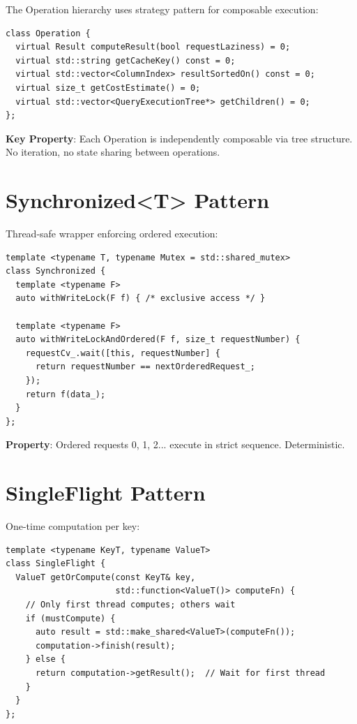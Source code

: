 \documentclass[12pt,oneside,a4paper]{book}
\theoremstyle{definition}
\begin{document}
The Operation hierarchy uses strategy pattern for composable execution:

\begin{lstlisting}
class Operation {
  virtual Result computeResult(bool requestLaziness) = 0;
  virtual std::string getCacheKey() const = 0;
  virtual std::vector<ColumnIndex> resultSortedOn() const = 0;
  virtual size_t getCostEstimate() = 0;
  virtual std::vector<QueryExecutionTree*> getChildren() = 0;
};
\end{lstlisting}

\textbf{Key Property}: Each Operation is independently composable via tree structure.
No iteration, no state sharing between operations.

\section{Synchronized<T> Pattern}
\label{sec:synchronized-pattern}

Thread-safe wrapper enforcing ordered execution:

\begin{lstlisting}
template <typename T, typename Mutex = std::shared_mutex>
class Synchronized {
  template <typename F>
  auto withWriteLock(F f) { /* exclusive access */ }

  template <typename F>
  auto withWriteLockAndOrdered(F f, size_t requestNumber) {
    requestCv_.wait([this, requestNumber] {
      return requestNumber == nextOrderedRequest_;
    });
    return f(data_);
  }
};
\end{lstlisting}

\textbf{Property}: Ordered requests 0, 1, 2... execute in strict sequence. Deterministic.

\section{SingleFlight Pattern}
\label{sec:singleflight}

One-time computation per key:

\begin{lstlisting}
template <typename KeyT, typename ValueT>
class SingleFlight {
  ValueT getOrCompute(const KeyT& key,
                      std::function<ValueT()> computeFn) {
    // Only first thread computes; others wait
    if (mustCompute) {
      auto result = std::make_shared<ValueT>(computeFn());
      computation->finish(result);
    } else {
      return computation->getResult();  // Wait for first thread
    }
  }
};
\end{lstlisting}
\end{document}
